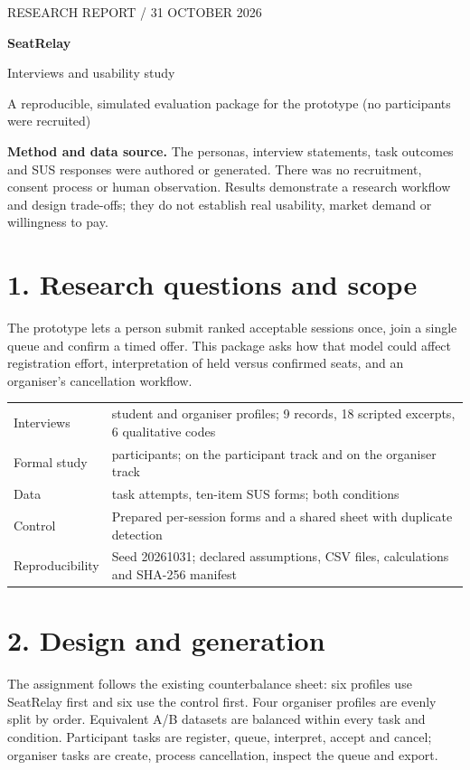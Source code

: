 \documentclass[a4paper,11pt]{article}
\begin{document}
{\color{accent}\small RESEARCH REPORT / 31 OCTOBER 2026}\par
{\Huge\bfseries SeatRelay}\par
{\LARGE Interviews and usability study}\par
{\large A reproducible, simulated evaluation package for the prototype (no participants were recruited)}\par
\vspace{8pt}
\colorbox{pale}{\parbox{\dimexpr\textwidth-2\fboxsep}{\textbf{Method and data source.}
The personas, interview statements, task outcomes and SUS responses were authored or generated.
There was no recruitment, consent process or human observation. Results demonstrate a research
workflow and design trade-offs; they do not establish real usability, market demand or willingness to pay.}}

\section*{1. Research questions and scope}
The prototype lets a person submit ranked acceptable sessions once, join a single queue and confirm
a timed offer. This package asks how that model could affect registration effort, interpretation of
held versus confirmed seats, and an organiser's cancellation workflow.

\begin{tabularx}{\textwidth}{@{}lL@{}}
\toprule
Interviews & \SimInterviewStudents{} student and \SimInterviewOrganisers{} organiser profiles;
9 records, 18 scripted excerpts, 6 qualitative codes\\
Formal study & \SimStudyN{} participants; \SimStudyParticipantN{} on the participant track and
\SimStudyOrganiserN{} on the organiser track\\
Data & \SimTaskAttempts{} task attempts, \SimSusForms{} ten-item SUS forms; both conditions\\
Control & Prepared per-session forms and a shared sheet with duplicate detection\\
Reproducibility & Seed 20261031; declared assumptions, CSV files, calculations and SHA-256 manifest\\
\bottomrule
\end{tabularx}

\section*{2. Design and generation}
The assignment follows the existing counterbalance sheet: six profiles use SeatRelay first and six
use the control first. Four organiser profiles are evenly split by order. Equivalent A/B datasets
are balanced within every task and condition. Participant tasks are register, queue, interpret,
accept and cancel; organiser tasks are create, process cancellation, inspect the queue and export.
\end{document}

